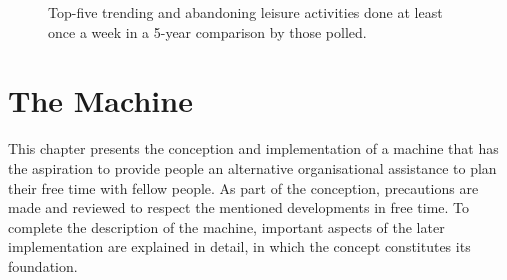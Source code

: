 \documentclass[12pt,numbers=noenddot,parskip,bibliography=totocnumbered,listof=totocnumbered,draft=true]{scrreprt}
\begin{document}
\begin{figure}
\caption[Trending and abonding leisure activites]{Top-five trending and abandoning leisure activities done at least once a week in a 5-year comparison by those polled. \citep{freizeitmonitor2016}}
\label{topfivechangingleisureactivities}
\end{figure}

\chapter{The Machine}
This chapter presents the conception and implementation of a machine that has the aspiration to provide people an alternative organisational assistance to plan their free time with fellow people. As part of the conception, precautions are made and reviewed to respect the mentioned developments in free time. To complete the description of the machine, important aspects of the later implementation are explained in detail, in which the concept constitutes its foundation.%
\end{document}
